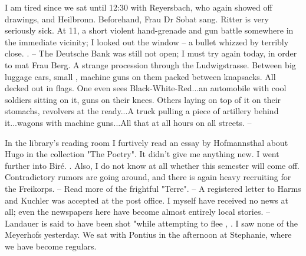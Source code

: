 
I am tired since we sat until 12:30 with Reyersbach, who again showed off drawings, and Heilbronn. Beforehand, Frau Dr Sobat sang. Ritter is very seriously sick. At 11, a short violent hand-grenade and gun battle somewhere in the immediate vicinity; I looked out the window -- a bullet whizzed by terribly close. . -- The Deutsche Bank was still not open; I must try again today, in order to mat Frau Berg. A strange procession through the Ludwigstrasse. Between big luggage cars, small , machine guns on them packed between knapsacks. All decked out in flags. One even sees Black-White-Red...an automobile with cool soldiers sitting on it, guns on their knees. Others laying on top of it on their stomachs, revolvers at the ready...A truck pulling a piece of artillery behind it...wagons with machine guns...All that at all hours on all streets. --

In the library's reading room I furtively read an essay by Hofmannsthal about Hugo in the collection "The Poetry". It didn't give me anything new. I went further into Biré. . Also, I do not know at all whether this semester will come off. Contradictory rumors are going around, and there is again heavy recruiting for the Freikorps. -- Read more of the frightful "Terre". -- A registered letter to Harms and Kuchler was accepted at the post office. I myself have received no news at all; even the newspapers here have become almost entirely local stories. -- Landauer is said to have been shot "while attempting to flee
, . I saw none of the Meyerhofs yesterday. We sat with Pontius in the afternoon at Stephanie, where we have become regulars.
